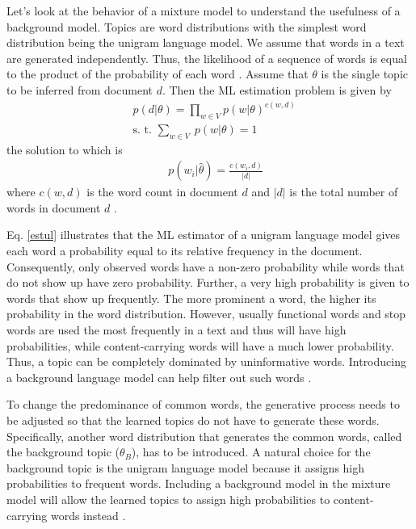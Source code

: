 \documentclass[11pt,a4paper,english,oneside]{book}
\numberwithin{equation}{chapter}
\begin{document}
Let's look at the behavior of a mixture model to understand the usefulness of a background model. Topics are word distributions with the simplest word distribution being the unigram language model. We assume that words in a text are generated independently. Thus, the likelihood of a sequence of words is equal to the product of the probability of each word \citep[p. 51--54]{Zhai.2016}. Assume that $\theta$ is the single topic to be inferred from document $d$. Then the ML estimation problem is given by
\begin{align}
\label{ul} & p(d|\theta) = \underset{w \in V}\prod p(w|\theta)^{c(w,d)}\\
\label{constraintsul} & \text{s. t. } \underset{w \in V}{\sum} \ p(w|\theta) = 1
\end{align}
the solution to which is
\begin{align}
\label{estul} & \ p(w_i|\hat{\theta}) = \frac{c(w_i,d)}{|d|}
\end{align}
where $c(w,d)$ is the word count in document $d$ and $|d|$ is the total number of words in document $d$ \citep[p. 341-343]{Zhai.2016}. 

Eq. \ref{estul} illustrates that the ML estimator of a unigram language model gives each word a probability equal to its relative frequency in the document. Consequently, only observed words have a non-zero probability while words that do not show up have zero probability. Further, a very high probability is given to words that show up frequently. The more prominent a word, the higher its probability in the word distribution. 
However, usually functional words and stop words are used the most frequently in a text and thus will have high probabilities, while content-carrying words will have a much lower probability. Thus, a topic can be completely dominated by uninformative words. Introducing a background language model can help filter out such words \citep[p. 51--54]{Zhai.2016}.  

To change the predominance of common words, the generative process needs to be adjusted so that the learned topics do not have to generate these words. Specifically, another word distribution that generates the common words, called the background topic ($\theta_B$), has to be introduced. A natural choice for the background topic is the unigram language model because it assigns high probabilities to frequent words. Including a background model in the mixture model will allow the learned topics to assign high probabilities to content-carrying words instead \citep[p. 346--347]{Zhai.2016}.  
\end{document}
